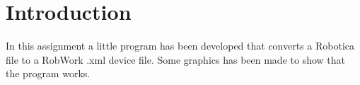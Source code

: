 \section{Introduction}
\label{sec:intro}


In this assignment a little program has been developed that converts a Robotica file to a RobWork .xml device file. 
Some graphics has been made to show that the program works.
